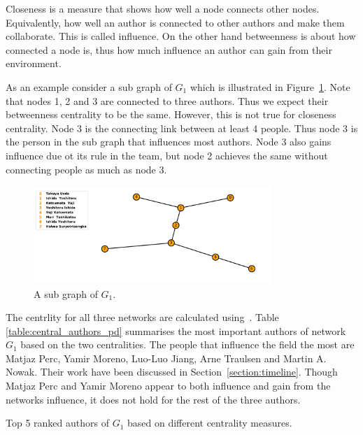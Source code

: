 \documentclass{article}
\theoremstyle{definition}
\begin{document}
Closeness is a measure that shows how well a node connects other nodes. Equivalently,
how well an author is connected to other authors and make them collaborate. 
This is called influence. On the other hand betweenness is about how connected a
node is, thus how much influence an author can gain from their environment.

As an example consider a sub graph of \(G_1\) which is illustrated in
Figure~\ref{fig:subgraph_t}. Note that nodes 1, 2 and 3 are connected to three
authors. Thus we expect their betweenness centrality to be the same. However, this
is not true for closeness centrality. Node 3 is the connecting link between at least
4 people. Thus node 3 is the person in the sub graph that influences most authors.
Node 3 also gains influence due ot its rule in the team, but node 2 achieves the
same without connecting people as much as node 3.

\begin{figure}[!hbtp]
    \centering
    \includegraphics[width=0.8\textwidth]{./assets/images/centrality_example.pdf}
    \caption{A sub graph of \(G_1\).}\label{fig:subgraph_t}
\end{figure}

The centrlity for all three networks are calculated using~\cite{networkx}. Table
\ref{table:central_authors_pd} summarises the most important authors of network
\(G_1\) based on the two centralities. The people that influence the field the
most are Matjaz Perc, Yamir Moreno, Luo-Luo Jiang, Arne Traulsen and Martin A.
Nowak. Their work have been discussed in Section~\ref{section:timeline}.
Though Matjaz Perc and Yamir Moreno appear to both influence and gain from
the networks influence, it does not hold for the rest of the three authors.

\begin{table}[!hbtp]
    \begin{center}
    \scalebox{0.8}{
    
    }
    \caption{Top 5 ranked authors of \(G_1\) based on different centrality measures.}
    \label{table:central_authors_pd}
    \end{center}
\end{table}
\end{document}
